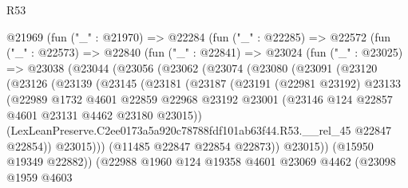 \begin{lexlean}{R53}
\begin{coremodule}
        @21969
          (fun ("_" : @21970) =>
          @22284
            (fun ("_" : @22285) =>
            @22572
              (fun ("_" : @22573) =>
              @22840
                (fun ("_" : @22841) =>
                @23024
                  (fun ("_" : @23025) =>
                  @23038
                    (@23044
                      (@23056
                        (@23062
                          (@23074
                            (@23080
                              (@23091
                                (@23120
                                  (@23126
                                    (@23139
                                      (@23145
                                        (@23181
                                          (@23187
                                            (@23191
                                              (@22981 @23192)
                                              @23133
                                              (@22989
                                                @1732
                                                @4601
                                                @22859
                                                @22968
                                                @23192
                                                @23001
                                                (@23146
                                                  @124
                                                  @22857
                                                  @4601
                                                  @23131
                                                  @4462
                                                  @23180
                                                  @23015))
                                              (LexLeanPreserve.C2ee0173a5a920c78788fdf101ab63f44.R53.__rel_45
                                                @22847
                                                @22854))
                                            @23015)))
                                      (@11485 @22847 @22854 @22873))
                                    @23015))
                                (@15950 @19349 @22882))
                              (@22988
                                @1960
                                @124
                                @19358
                                @4601
                                @23069
                                @4462
                                (@23098
                                  @1959
                                  @4603

\end{coremodule}
\end{lexlean}
